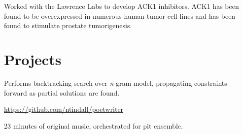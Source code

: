 \documentclass[letterpaper]{deedy-resume} %
\begin{document}
\begin{minipage}[t]{0.66\textwidth}
\sectionspace %



\begin{tightitemize}
\item Worked with the Lawrence Labs to develop ACK1 inhibitors. ACK1 has been found to be overexpressed in numerous human tumor cell lines and has been found to stimulate prostate tumorigenesis. 
\end{tightitemize}


\sectionspace %

\section{Projects}
\begin{tightitemize}
\item Performs backtracking search over \emph{n}-gram model, propagating constraints forward as partial solutions are found.
\item \url{https://github.com/ntindall/poetwriter}
\end{tightitemize}
\sectionspace %

\begin{tightitemize}
\item 23 minutes of original music, orchestrated for pit ensemble.
\end{tightitemize}




\end{minipage}
\end{document}
